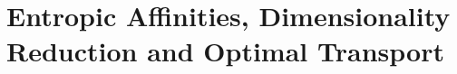 \section{Entropic Affinities, Dimensionality Reduction and Optimal Transport}\label{sec:background}








